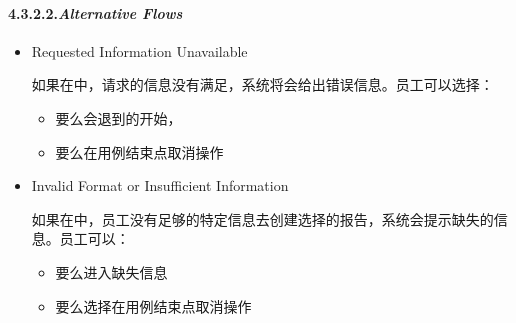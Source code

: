\documentclass{article}
\begin{document}
\paragraph{4.3.2.2.\hspace*{0.5em}\emph{Alternative Flows}}\label{sec-_alternative-flows_}%

\begin{itemize}%

\item{}
Requested Information Unavailable%

如果在中，请求的信息没有满足，系统将会给出错误信息。员工可以选择：%

\begin{itemize}[noitemsep,topsep=\mdcompacttopsep]%

\item{}要么会退到的开始，%

\item{}要么在用例结束点取消操作%
\end{itemize}%
\end{itemize}%

\begin{itemize}%

\item{}
Invalid Format or Insufficient Information%

如果在中，员工没有足够的特定信息去创建选择的报告，系统会提示缺失的信息。员工可以：%

\begin{itemize}[noitemsep,topsep=\mdcompacttopsep]%

\item{}要么进入缺失信息%

\item{}要么选择在用例结束点取消操作%
\end{itemize}%
\end{itemize}%

\end{document}
